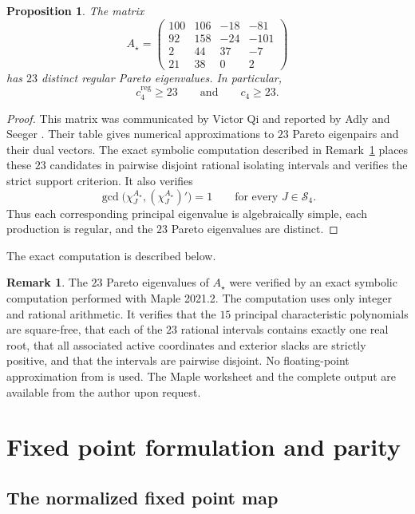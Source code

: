 \documentclass[11pt,a4paper]{article}
\newtheorem{proposition}[theorem]{Proposition}
\theoremstyle{definition}
\newtheorem{remark}[theorem]{Remark}
\newcommand{\Supp}{\mathscr S}
\begin{document}
\begin{proposition}
\label{prop:lower-bound}
The matrix
$$
A_\star=
\begin{pmatrix}
100&106&-18&-81\\
92&158&-24&-101\\
2&44&37&-7\\
21&38&0&2
\end{pmatrix}
$$
has $23$ distinct regular Pareto eigenvalues. In particular,
$$
c_4^{\mathrm{reg}}\geq23
\qquad\text{and}\qquad
c_4\geq23.
$$
\end{proposition}
\begin{proof}
This matrix was communicated by Victor Qi and reported by Adly and
Seeger \cite[Section~2.2.2, p.~309, Table~2]{AdlySeeger2011}. Their
table gives numerical approximations to $23$ Pareto eigenpairs and
their dual vectors. The exact symbolic computation described in
Remark~\ref{rem:maple-certificate} places these $23$ candidates in
pairwise disjoint rational isolating intervals and verifies the strict
support criterion. It also verifies
$$
\gcd\bigl(\chi_J^{A_\star},(\chi_J^{A_\star})'\bigr)=1
\qquad
\text{for every }J\in\Supp_4.
$$
Thus each corresponding principal eigenvalue is algebraically simple,
each production is regular, and the $23$ Pareto eigenvalues are
distinct.
\end{proof}

The exact computation is described below.

\begin{remark}
\label{rem:maple-certificate}
The $23$ Pareto eigenvalues of $A_\star$ were verified by an exact symbolic computation performed with Maple 2021.2. The computation uses only integer and rational arithmetic. It verifies that the $15$ principal characteristic polynomials are square-free, that each of the $23$ rational intervals contains exactly one real root, that all associated active coordinates and exterior slacks are strictly positive, and that the intervals are pairwise disjoint. No floating-point approximation from \cite[Table~2]{AdlySeeger2011} is used. The Maple worksheet and the complete output are available from the author upon request.
\end{remark}
\section{Fixed point formulation and parity}
\label{sec:parity}

\subsection{The normalized fixed point map}
\end{document}
